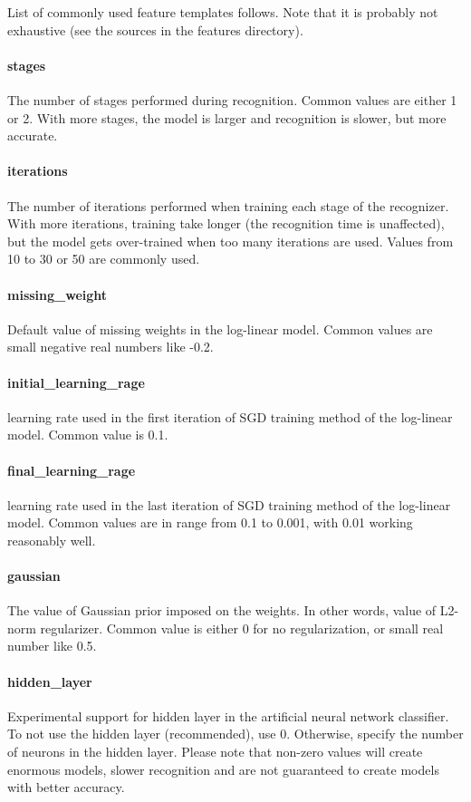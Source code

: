 List of commonly used feature templates follows. Note that it is probably not
exhaustive (see the sources in the features directory).

\paragraph{stages}
The number of stages performed during recognition. Common values are either 1 or
2. With more stages, the model is larger and recognition is slower, but more accurate.

\paragraph{iterations}
The number of iterations performed when training each stage of the recognizer.
With more iterations, training take longer (the recognition time is unaffected),
but the model gets over-trained when too many iterations are used. Values from 10
to 30 or 50 are commonly used.

\paragraph{missing\_weight}
Default value of missing weights in the log-linear model. Common values are small
negative real numbers like -0.2.

\paragraph{initial\_learning\_rage}
learning rate used in the first iteration of SGD training method of the log-linear
model. Common value is 0.1.

\paragraph{final\_learning\_rage}
learning rate used in the last iteration of SGD training method of the log-linear
model. Common values are in range from 0.1 to 0.001, with 0.01 working reasonably well.

\paragraph{gaussian}
The value of Gaussian prior imposed on the weights. In other words, value of
L2-norm regularizer. Common value is either 0 for no regularization, or small
real number like 0.5.

\paragraph{hidden\_layer}
Experimental support for hidden layer in the artificial neural network classifier.
To not use the hidden layer (recommended), use 0. Otherwise, specify the number
of neurons in the hidden layer. Please note that non-zero values will create
enormous models, slower recognition and are not guaranteed to create models with
better accuracy.

